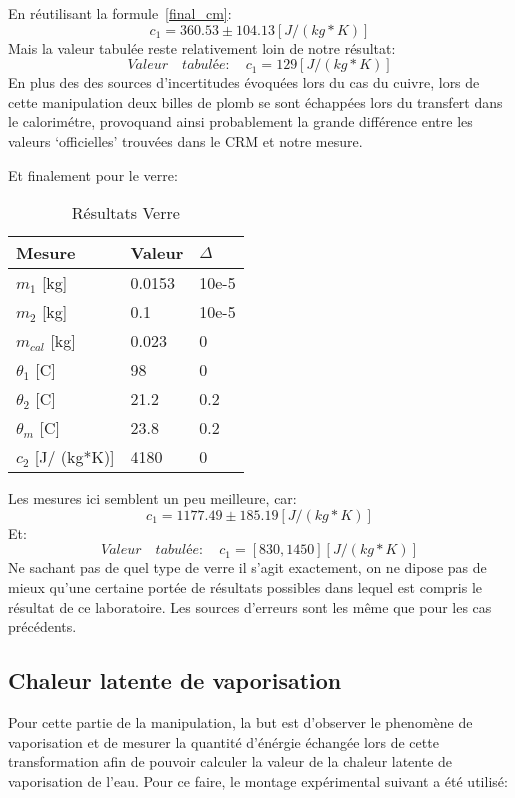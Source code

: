 En réutilisant la formule~\eqref{final_cm}:
\begin{equation}
    c_1 = 360.53 \pm 104.13[J/ (kg*K)]
\end{equation}
Mais la valeur tabulée reste relativement loin de notre résultat:
\begin{equation}
    Valeur\quad tabulée:\quad c_1 = 129[J/ (kg*K)]
\end{equation}
En plus des des sources d'incertitudes évoquées lors du cas du cuivre, lors de cette manipulation deux billes de plomb se sont échappées lors du transfert dans le calorimétre, provoquand ainsi probablement la grande différence entre les valeurs `officielles' trouvées dans le CRM et notre mesure.

\newpage
Et finalement pour le verre:
\begin{table}[!h]
    \centering
    \caption{Résultats Verre}
    \begin{tabular}{|l|l|l|}
	\hline
	Mesure	&Valeur	&$\Delta$\\
	\hline
	$m_1$ [kg]	&0.0153	&10e-5\\
	$m_2$ [kg]	&0.1	&10e-5\\
	$m_{cal}$ [kg]	&0.023	&0\\
	$\theta_1$ [C\degree]	&98	&0\\
	$\theta_2$ [C\degree]	&21.2	&0.2\\
	$\theta_m$ [C\degree]	&23.8	&0.2\\
	$c_2$ [J/ (kg*K)]	&4180	&0\\
	\hline
    \end{tabular}
\end{table}

Les mesures ici semblent un peu meilleure, car:
\begin{equation}
    c_1 = 1177.49 \pm 185.19[J/ (kg*K)]
\end{equation}
Et:\\
\begin{equation}
    Valeur\quad tabulée:\quad c_1 = [830,1450][J/ (kg*K)]
\end{equation}
Ne sachant pas de quel type de verre il s'agit exactement, on ne dipose pas de mieux qu'une certaine portée de résultats possibles dans lequel est compris le résultat de ce laboratoire. Les sources d'erreurs sont les même que pour les cas précédents.

\newpage
\subsection{Chaleur latente de vaporisation}
Pour cette partie de la manipulation, la but est d'observer le phenomène de vaporisation et de mesurer la quantité d'énérgie échangée lors de cette transformation afin de pouvoir calculer la valeur de la chaleur latente de vaporisation de l'eau.
Pour ce faire, le montage expérimental suivant a été utilisé:

